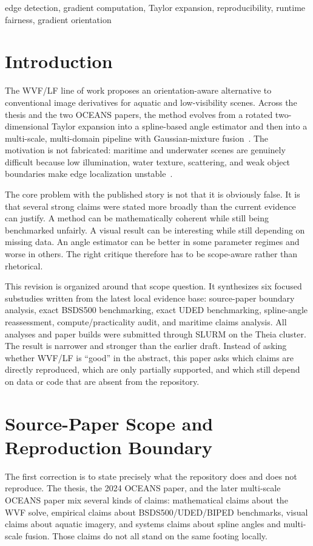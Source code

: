 \documentclass[conference]{IEEEtran}
\begin{document}
\begin{IEEEkeywords}
edge detection, gradient computation, Taylor expansion, reproducibility, runtime fairness, gradient orientation
\end{IEEEkeywords}

\section{Introduction}
The WVF/LF line of work proposes an orientation-aware alternative to conventional image derivatives for aquatic and low-visibility scenes. Across the thesis and the two OCEANS papers, the method evolves from a rotated two-dimensional Taylor expansion into a spline-based angle estimator and then into a multi-scale, multi-domain pipeline with Gaussian-mixture fusion~\cite{bagan2023thesis,bagan2024oceans,bagan2025oceans}. The motivation is not fabricated: maritime and underwater scenes are genuinely difficult because low illumination, water texture, scattering, and weak object boundaries make edge localization unstable~\cite{marques2019,ji2023}.

The core problem with the published story is not that it is obviously false. It is that several strong claims were stated more broadly than the current evidence can justify. A method can be mathematically coherent while still being benchmarked unfairly. A visual result can be interesting while still depending on missing data. An angle estimator can be better in some parameter regimes and worse in others. The right critique therefore has to be scope-aware rather than rhetorical.

This revision is organized around that scope question. It synthesizes six focused substudies written from the latest local evidence base: source-paper boundary analysis, exact BSDS500 benchmarking, exact UDED benchmarking, spline-angle reassessment, compute/practicality audit, and maritime claims analysis. All analyses and paper builds were submitted through SLURM on the Theia cluster. The result is narrower and stronger than the earlier draft. Instead of asking whether WVF/LF is ``good'' in the abstract, this paper asks which claims are directly reproduced, which are only partially supported, and which still depend on data or code that are absent from the repository.

\section{Source-Paper Scope and Reproduction Boundary}
The first correction is to state precisely what the repository does and does not reproduce. The thesis, the 2024 OCEANS paper, and the later multi-scale OCEANS paper mix several kinds of claims: mathematical claims about the WVF solve, empirical claims about BSDS500/UDED/BIPED benchmarks, visual claims about aquatic imagery, and systems claims about spline angles and multi-scale fusion. Those claims do not all stand on the same footing locally.
\end{document}
